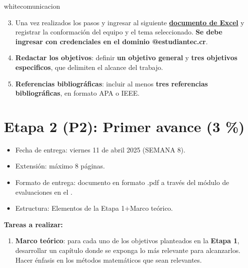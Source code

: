 {white}{comunicacion}


\begin{enumerate}
\setcounter{enumi}{2}
\item Una vez realizados los pasos  y  ingresar al siguiente \href{https://estudianteccr-my.sharepoint.com/:x:/g/personal/prof_glacy_estudiantec_cr/Eb3cnsJ318ZCiCbvQZV8QToB3RXEgbzVeGjASaGxJvZx7g?e=UOcGrV}{\textbf{documento 
 de Excel}} y registrar la conformaci\'on del equipo y el tema seleccionado. \textbf{Se debe ingresar con credenciales en el dominio @estudiantec.cr}.
\item \textbf{Redactar los objetivos}: definir \textbf{un objetivo general} y \textbf{tres objetivos especificos}, que  delimiten el alcance del trabajo. 
\item \textbf{Referencias bibliogr\'aficas}:  incluir al menos \textbf{\textcolor{c1}{tres referencias bibliogr\'aficas}}, en formato APA o IEEE.

\end{enumerate}


\section*{Etapa 2 (P2): Primer avance (3 \%)}

\begin{itemize}
    \item[\checkmark] Fecha de entrega: viernes 11 de abril 2025 (SEMANA 8).
    \item[\checkmark] Extensi\'on:  m\'aximo 8 p\'aginas.
    \item[\checkmark] Formato de entrega: documento en formato .pdf a través del módulo de evaluaciones en el \td.
       
    \item[\checkmark] Estructura: 
     Elementos de la Etapa 1$+$Marco te\'orico.
\end{itemize}
\textbf{Tareas a realizar:}

\begin{enumerate}
    \item \textbf{Marco teórico}: para cada uno de los objetivos planteados en la \textbf{Etapa 1}, desarrollar un capítulo donde se exponga lo más relevante para alcanzarlos. Hacer \'enfasis en los m\'etodos matem\'aticos que sean relevantes.

\end{enumerate}

